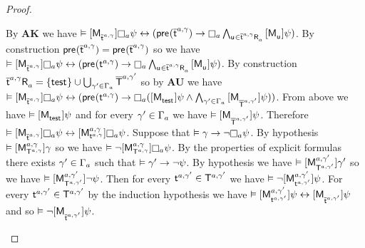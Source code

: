 \begin{proof}
\begin{enumerate}
\begin{description}
                By {\bf AK} we have $\entails \actionA{\aPModel{\aPStateT[\agentA, \gamma]}} \necessaryA \psi \iff (\aPrecondition(\aPStateT[\agentA, \gamma]) \implies \necessaryA \bigwedge_{\aStateU \in \aSuccessorsA{\aPStateT[\agentA, \gamma]}} \actionA{\aPModel{\aStateU}} \psi)$.
                By construction $\aPrecondition(\aPStateT[\agentA, \gamma]) = \aPrecondition(\aPStateT[\agentA, \gamma])$ so we have $\entails \actionA{\aPModel{\aPStateT[\agentA, \gamma]}} \necessaryA \psi \iff (\aPrecondition(\aStateT[\agentA, \gamma]) \implies \necessaryA \bigwedge_{\aStateU \in \aSuccessorsA{\aPStateT[\agentA, \gamma]}} \actionA{\aPModel{\aStateU}} \psi)$.
                By construction $\aSuccessorsA{\aPStateT[\agentA, \gamma]} = \{\aStateTest\} \cup \bigcup_{\gamma' \in \Gamma_\agentA} \aPStatesT[\agentA, \gamma']$ so by {\bf AU} we have $\entails \actionA{\aPModel{\aPStateT[\agentA, \gamma]}} \necessaryA \psi \iff (\aPrecondition(\aStateT[\agentA, \gamma]) \implies \necessaryA (\actionA{\aPModel{\aStateTest}} \psi \land \bigwedge_{\gamma' \in \Gamma_\agentA} \actionA{\aPModel{\aPStatesT[\agentA, \gamma']}} \psi))$.
                From above we have $\entails \actionA{\aPModel{\aStateTest}} \psi$ and for every $\gamma' \in \Gamma_\agentA$ we have $\entails \actionA{\aPModel{\aPStatesT[\agentA, \gamma']}} \psi$.
                Therefore $\entails \actionA{\aPModel{\aPStateT[\agentA, \gamma]}} \necessaryA \psi \iff \actionA{\aPModel[\agentA, \gamma]{\aStateT[\agentA, \gamma]}} \necessaryA \psi$.
                Suppose that $\entails \gamma \implies \lnot \necessaryA \psi$.
                By hypothesis $\entails \actionA{\aPModel[\agentA, \gamma]{\aStatesT[\agentA, \gamma]}} \gamma$ so we have $\entails \lnot \actionA{\aPModel[\agentA, \gamma]{\aStatesT[\agentA, \gamma]}} \necessaryA \psi$.
                By the properties of explicit formulas there exists $\gamma' \in \Gamma_\agentA$ such that $\entails \gamma' \implies \lnot \psi$.
                By hypothesis we have $\entails \actionA{\aPModel[\agentA, \gamma']{\aStatesT[\agentA, \gamma']}} \gamma'$ so we have $\entails \actionA{\aPModel[\agentA, \gamma']{\aStatesT[\agentA, \gamma']}} \lnot \psi$.
                Then for every $\aStateT[\agentA, \gamma'] \in \aStatesT[\agentA, \gamma']$ we have $\entails \lnot \actionA{\aPModel[\agentA, \gamma']{\aStateT[\agentA, \gamma']}} \psi$.
                For every $\aStateT[\agentA, \gamma'] \in \aStatesT[\agentA, \gamma']$ by the induction hypothesis we have $\entails \actionA{\aPModel[\agentA, \gamma']{\aStateT[\agentA, \gamma']}} \psi \iff \actionA{\aPModel{\aPStateT[\agentA, \gamma']}} \psi$ and so $\entails \lnot \actionA{\aPModel{\aPStateT[\agentA, \gamma']}} \psi$.

\end{description}
\end{enumerate}
\end{proof}
